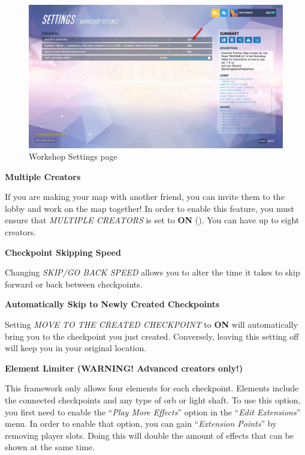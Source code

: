 \documentclass[12pt,a4paper]{article}
\begin{document}
        \begin{figure}[ht]
            \centering
            \includegraphics[width=\textwidth,height=\textheight,keepaspectratio]{Picture5.png}
            \caption{Workshop Settings page}
            \label{fig:Picture5}
        \end{figure}
        
        \textbf{Multiple Creators}
        
        If you are making your map with another friend, you can invite them to the lobby and work on the map together! In order to enable this feature, you must ensure that \textit{MULTIPLE CREATORS} is set to \textbf{ON} (). You can have up to eight creators.
        
        \textbf{Checkpoint Skipping Speed}
        
        Changing \textit{SKIP/GO BACK SPEED} allows you to alter the time it takes to skip forward or back between checkpoints.
        
        \textbf{Automatically Skip to Newly Created Checkpoints}
        
        Setting \textit{MOVE TO THE CREATED CHECKPOINT} to \textbf{ON} will automatically bring you to the checkpoint you just created. Conversely, leaving this setting off will keep you in your original location.
        
        \textbf{Element Limiter (WARNING! Advanced creators only!)}
        
        This framework only allows four elements for each checkpoint. Elements include the connected checkpoints and any type of orb or light shaft. To use this option, you first need to enable the ``\textit{Play More Effects}'' option in the ``\textit{Edit Extensions}'' menu. In order to enable that option, you can gain ``\textit{Extension Points}'' by removing player slots. Doing this will double the amount of effects that can be shown at the same time.
        
\end{document}
